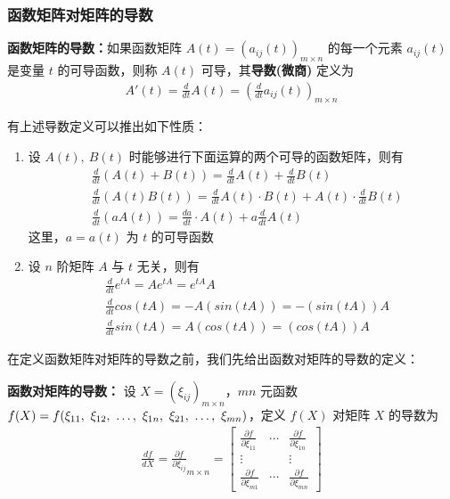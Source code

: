         \subsubsection{函数矩阵对矩阵的导数}
            \par \textbf{函数矩阵的导数：}如果函数矩阵 $A(t) = (a_{ij}(t))_{m \times n}$ 的每一个元素 $a_{ij}(t)$ 是变量 $t$ 的可导函数，则称 $A(t)$ 可导，其\textbf{导数(微商)} 定义为 
            \begin{align*}
                A'(t) = \frac{d}{dt}A(t) = (\frac{d}{dt}a_{ij}(t))_{m \times n} 
            \end{align*}
            \par 有上述导数定义可以推出如下性质：
            \begin{enumerate}
                \item 设 $A(t), \ B(t)$ 时能够进行下面运算的两个可导的函数矩阵，则有
                    \begin{align*}
                        &\frac{d}{dt}(A(t) + B(t)) = \frac{d}{dt}A(t) + \frac{d}{dt}B(t) \\ &\frac{d}{dt}(A(t)B(t)) = \frac{d}{dt}A(t) \cdot B(t) + A(t) \cdot \frac{d}{dt}B(t) \\ &\frac{d}{dt}(aA(t)) = \frac{da}{dt} \cdot A(t) + a\frac{d}{dt}A(t)
                    \end{align*}
                    这里，$a = a(t)$ 为 $t$ 的可导函数
                \item 设 $n$ 阶矩阵 $A$ 与 $t$ 无关，则有
                    \begin{align*}
                        &\frac{d}{dt}e^{tA} = Ae^{tA} = e^{tA}A \\ &\frac{d}{dt}cos(tA) = -A(sin(tA)) = -(sin(tA))A \\ &\frac{d}{dt}sin(tA) = A(cos(tA)) = (cos(tA))A
                    \end{align*}
            \end{enumerate}

            \par 在定义函数矩阵对矩阵的导数之前，我们先给出函数对矩阵的导数的定义：
            \par \textbf{函数对矩阵的导数：} 设 $X = (\xi_{ij})_{m \times n}$，$mn$ 元函数 $f(X) = f(\xi_{11}, \ \xi_{12}, \ \dots, \\ \ \xi_{1n}, \ \xi_{21}, \ \dots, \ \xi_{mn})$，定义 $f(X)$ 对矩阵 $X$ 的导数为
            \begin{align*}
                \frac{df}{dX} = \frac{\partial f}{\partial \xi_{ij}}_{m \times n} = \begin{bmatrix}
                    \frac{\partial f}{\partial \xi_{11}} & \cdots & \frac{\partial f}{\partial \xi_{1n}} \\ \vdots & & \vdots \\ \frac{\partial f}{\partial \xi_{m1}} & \cdots & \frac{\partial f}{\partial \xi_{mn}}
                \end{bmatrix}
            \end{align*}

